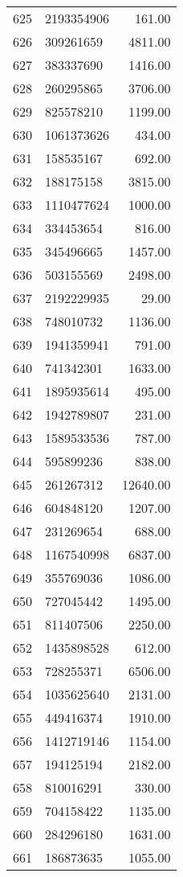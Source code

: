 \begin{table}[ht]
\begin{tabular}{rlr}
  625 & 2193354906 & 161.00 \\ 
  626 & 309261659 & 4811.00 \\ 
  627 & 383337690 & 1416.00 \\ 
  628 & 260295865 & 3706.00 \\ 
  629 & 825578210 & 1199.00 \\ 
  630 & 1061373626 & 434.00 \\ 
  631 & 158535167 & 692.00 \\ 
  632 & 188175158 & 3815.00 \\ 
  633 & 1110477624 & 1000.00 \\ 
  634 & 334453654 & 816.00 \\ 
  635 & 345496665 & 1457.00 \\ 
  636 & 503155569 & 2498.00 \\ 
  637 & 2192229935 & 29.00 \\ 
  638 & 748010732 & 1136.00 \\ 
  639 & 1941359941 & 791.00 \\ 
  640 & 741342301 & 1633.00 \\ 
  641 & 1895935614 & 495.00 \\ 
  642 & 1942789807 & 231.00 \\ 
  643 & 1589533536 & 787.00 \\ 
  644 & 595899236 & 838.00 \\ 
  645 & 261267312 & 12640.00 \\ 
  646 & 604848120 & 1207.00 \\ 
  647 & 231269654 & 688.00 \\ 
  648 & 1167540998 & 6837.00 \\ 
  649 & 355769036 & 1086.00 \\ 
  650 & 727045442 & 1495.00 \\ 
  651 & 811407506 & 2250.00 \\ 
  652 & 1435898528 & 612.00 \\ 
  653 & 728255371 & 6506.00 \\ 
  654 & 1035625640 & 2131.00 \\ 
  655 & 449416374 & 1910.00 \\ 
  656 & 1412719146 & 1154.00 \\ 
  657 & 194125194 & 2182.00 \\ 
  658 & 810016291 & 330.00 \\ 
  659 & 704158422 & 1135.00 \\ 
  660 & 284296180 & 1631.00 \\ 
  661 & 186873635 & 1055.00 \\ 

\end{tabular}
\end{table}
